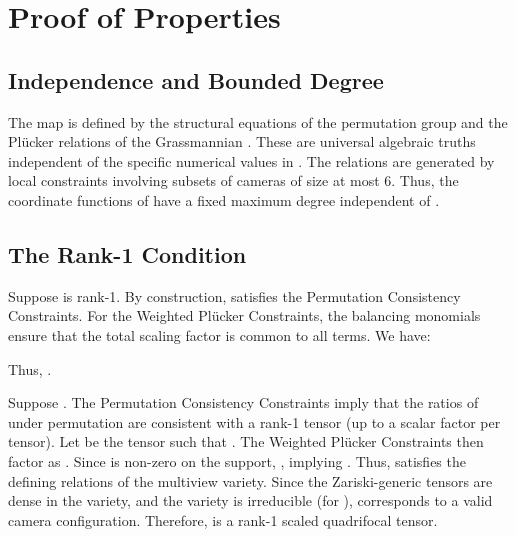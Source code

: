 \documentclass[12pt]{article}
\theoremstyle{definition}
\begin{document}
\section{Proof of Properties}

\subsection{Independence and Bounded Degree}
The map  is defined by the structural equations of the permutation group and the Plücker relations of the Grassmannian . These are universal algebraic truths independent of the specific numerical values in . The relations are generated by local constraints involving subsets of cameras of size at most 6. Thus, the coordinate functions of  have a fixed maximum degree independent of .

\subsection{The Rank-1 Condition}
 Suppose  is rank-1. By construction,  satisfies the Permutation Consistency Constraints. For the Weighted Plücker Constraints, the balancing monomials ensure that the total scaling factor  is common to all terms. We have:

Thus, .

 Suppose . The Permutation Consistency Constraints imply that the ratios of  under permutation are consistent with a rank-1 tensor  (up to a scalar factor per tensor). Let  be the tensor such that . The Weighted Plücker Constraints then factor as . Since  is non-zero on the support, , implying . Thus,  satisfies the defining relations of the multiview variety. Since the Zariski-generic tensors are dense in the variety, and the variety is irreducible (for ),  corresponds to a valid camera configuration. Therefore,  is a rank-1 scaled quadrifocal tensor.
\end{document}

